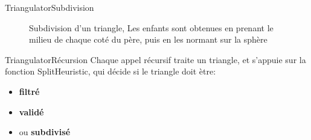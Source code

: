 \documentclass[french]{beamer}
\begin{document}
\begin{frame}{Triangulator}{Subdivision}
\begin{figure}
{   
   }
   \caption{Subdivision d'un triangle, Les enfants sont obtenues en prenant le milieu de chaque coté du père, puis en les normant sur la sphère}
   
\end{figure}
\end{frame}

\begin{frame}{Triangulator}{Récursion}
Chaque appel récursif traite un triangle, et s'appuie sur la fonction SplitHeuristic, qui décide si le triangle doit ètre:
\newline
  \begin{itemize}
  \item {
    \textbf{filtré}
  }
  \item {
    \textbf{validé}
  }
  \item {
   ou \textbf{subdivisé}
  }
  \end{itemize}
\end{frame}
\end{document}
